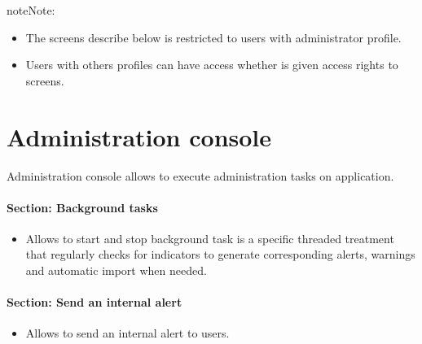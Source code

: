 \documentclass[letterpaper,10pt,english]{sphinxmanual}
\begin{document}
\begin{notice}{note}{Note:}\begin{itemize}
\item {} 
The screens describe below  is restricted to users with administrator profile.

\item {} 
Users with others profiles can have access whether is given access rights to screens.

\end{itemize}
\end{notice}


\section{Administration console}
\label{Administration:index-0}\label{Administration::doc}\label{Administration:administration-console}
Administration console allows to execute administration tasks on application.
\paragraph{Section: Background tasks}
\begin{itemize}
\item {} 
Allows to start and stop background task is a specific threaded treatment that regularly checks for indicators to generate corresponding alerts, warnings and automatic import when needed.

\end{itemize}
\paragraph{Section: Send an internal alert}
\begin{itemize}
\item {} 
Allows to send an internal alert to users.

\end{itemize}
\end{document}
